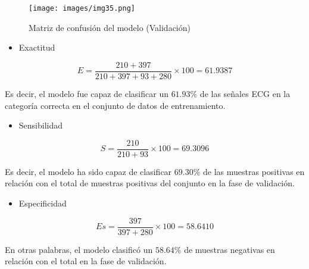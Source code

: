 \begin{figure}[!ht]
    \centering
    \texttt{[image: images/img35.png]}
    \caption[]{Matriz de confusión del modelo (Validación)}
    \label{fig:Mat_Conf_Val}
\end{figure}


\begin{itemize}
    \item Exactitud
\end{itemize}

\begin{equation}
    E = \frac{210 + 397}{210 + 397 + 93 + 280} \times 100 = 61.9387
\end{equation}

Es decir, el modelo fue capaz de clasificar un $61.93\%$ de las señales ECG en la categoría correcta en el conjunto de datos de entrenamiento.

\begin{itemize}
    \item Sensibilidad
\end{itemize}

\begin{equation}
    S = \frac{210}{210 + 93} \times 100 = 69.3096
\end{equation}

Es decir, el modelo ha sido capaz de clasificar $69.30\%$ de las muestras positivas en relación con el total de muestras positivas del conjunto en la fase de validación.

\begin{itemize}
    \item Especificidad
\end{itemize}

\begin{equation}
    Es = \frac{397}{397 + 280} \times 100 = 58.6410
\end{equation}

En otras palabras, el modelo clasificó un $58.64\%$ de muestras negativas en relación con el total en la fase de validación.


